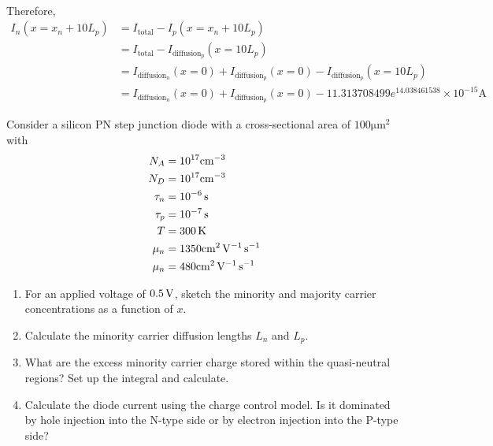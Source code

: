 \documentclass[fleqn, a4paper, 10pt, oneside]{amsart}
\theoremstyle{definition}
\theoremstyle{theorem}
\begin{document}
\begin{solution}
\begin{enumerate}[leftmargin=*]
\begin{enumerate}[leftmargin=*]
\begin{align*}
					\end{align*}
					Therefore,
					\begin{align*}
						I_n(x = x_n + 10 L_p) & = I_{\text{total}} - I_p(x = x_n + 10 L_p)                                                           \\
                                                                      & = I_{\text{total}} - I_{\text{diffusion}_p}(x = 10 L_p)                                              \\
                                                                      & = I_{\text{diffusion}_n}(x = 0) + I_{\text{diffusion}_p}(x = 0) - I_{\text{diffusion}_p}(x = 10 L_p) \\
                                                                      & = I_{\text{diffusion}_n}(x = 0) + I_{\text{diffusion}_p}(x = 0) - 11.313708499 e^{14.038461538} \times 10^{-15} \si{\ampere}
					\end{align*}
			\end{enumerate}
	\end{enumerate}
\end{solution}

\begin{question}
	Consider a silicon PN step junction diode with a cross-sectional area of $100 \si{\micro\metre\squared}$ with
	\begin{align*}
		N_A    & = 10^{17} \si{\per\centi\metre\cubed}                \\
		N_D    & = 10^{17} \si{\per\centi\metre\cubed}                \\
		\tau_n & = 10^{-6} \second                                    \\
		\tau_p & = 10^{-7} \second                                    \\
		T      & = 300 \kelvin                                        \\
		\mu_n  & = 1350 \si{\centi\metre\squared\per\volt\per\second} \\
		\mu_n  & = 480 \si{\centi\metre\squared\per\volt\per\second}
	\end{align*}
	\begin{enumerate}
		\item
			For an applied voltage of $0.5 \volt$, sketch the minority and majority carrier concentrations as a function of $x$.
		\item
			Calculate the minority carrier diffusion lengths $L_n$ and $L_p$.
		\item
			What are the excess minority carrier charge stored within the quasi-neutral regions?
			Set up the integral and calculate.
		\item
			Calculate the diode current using the charge control model.
			Is it dominated by hole injection into the N-type side or by electron injection into the P-type side?
	\end{enumerate}
\end{question}
\end{document}
